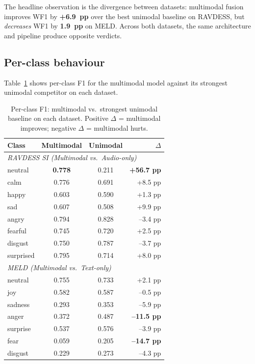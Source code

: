 \documentclass[a4paper,10pt]{article}
\begin{document}
The headline observation is the divergence between datasets: multimodal
fusion improves WF1 by \textbf{+6.9~pp} over the best unimodal baseline on
RAVDESS, but \emph{decreases} WF1 by \textbf{1.9~pp} on MELD. Across both
datasets, the same architecture and pipeline produce opposite verdicts.

\subsection{Per-class behaviour}

Table~\ref{tab:perclass} shows per-class F1 for the multimodal model
against its strongest unimodal competitor on each dataset.

\begin{table}[t]
\centering
\caption{Per-class F1: multimodal vs.\ strongest unimodal baseline on each
dataset. Positive $\Delta$ = multimodal improves; negative $\Delta$ =
multimodal hurts.}
\label{tab:perclass}
\small
\begin{tabular}{lccr}
\toprule
\textbf{Class} & \textbf{Multimodal} & \textbf{Unimodal} & \textbf{$\Delta$} \\
\midrule
\multicolumn{4}{l}{\emph{RAVDESS SI (Multimodal vs.\ Audio-only)}} \\
neutral   & \textbf{0.778} & 0.211 & \textbf{+56.7 pp} \\
calm      & 0.776 & 0.691 & +8.5 pp \\
happy     & 0.603 & 0.590 & +1.3 pp \\
sad       & 0.607 & 0.508 & +9.9 pp \\
angry     & 0.794 & 0.828 & --3.4 pp \\
fearful   & 0.745 & 0.720 & +2.5 pp \\
disgust   & 0.750 & 0.787 & --3.7 pp \\
surprised & 0.795 & 0.714 & +8.0 pp \\
\midrule
\multicolumn{4}{l}{\emph{MELD (Multimodal vs.\ Text-only)}} \\
neutral   & 0.755 & 0.733 & +2.1 pp \\
joy       & 0.582 & 0.587 & --0.5 pp \\
sadness   & 0.293 & 0.353 & --5.9 pp \\
anger     & 0.372 & 0.487 & \textbf{--11.5 pp} \\
surprise  & 0.537 & 0.576 & --3.9 pp \\
fear      & 0.059 & 0.205 & \textbf{--14.7 pp} \\
disgust   & 0.229 & 0.273 & --4.3 pp \\
\bottomrule
\end{tabular}
\end{table}
\end{document}
